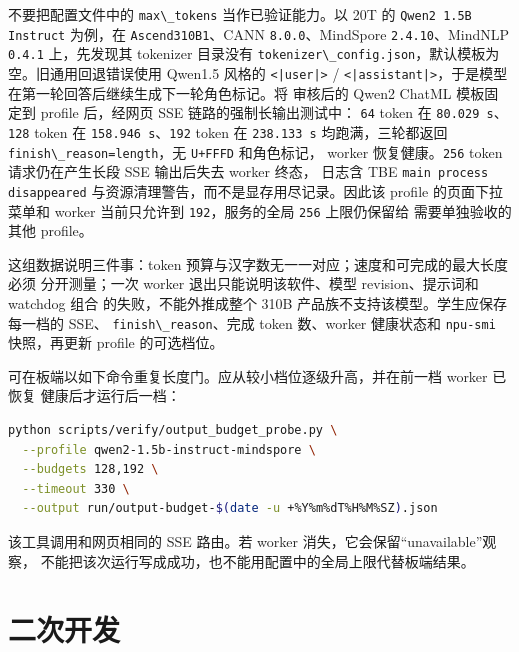 不要把配置文件中的 \passthrough{\lstinline!max\_tokens!}
当作已验证能力。以 20T 的 \passthrough{\lstinline!Qwen2 1.5B Instruct!}
为例，在 \passthrough{\lstinline!Ascend310B1!}、CANN
\passthrough{\lstinline!8.0.0!}、MindSpore
\passthrough{\lstinline!2.4.10!}、MindNLP
\passthrough{\lstinline!0.4.1!} 上，先发现其 tokenizer 目录没有
\passthrough{\lstinline!tokenizer\_config.json!}，默认模板为空。旧通用回退错误使用
Qwen1.5 风格的 \passthrough{\lstinline!<|user|>!} /
\passthrough{\lstinline!<|assistant|>!}，于是模型在第一轮回答后继续生成下一轮角色标记。将
审核后的 Qwen2 ChatML 模板固定到 profile 后，经网页 SSE
链路的强制长输出测试中： \passthrough{\lstinline!64!} token 在
\passthrough{\lstinline!80.029 s!}、\passthrough{\lstinline!128!} token
在 \passthrough{\lstinline!158.946 s!}、\passthrough{\lstinline!192!}
token 在 \passthrough{\lstinline!238.133 s!} 均跑满，三轮都返回
\passthrough{\lstinline!finish\_reason=length!}，无
\passthrough{\lstinline!U+FFFD!} 和角色标记， worker
恢复健康。\passthrough{\lstinline!256!} token 请求仍在产生长段 SSE
输出后失去 worker 终态， 日志含 TBE
\passthrough{\lstinline!main process disappeared!}
与资源清理警告，而不是显存用尽记录。因此该 profile 的页面下拉菜单和
worker 当前只允许到 \passthrough{\lstinline!192!}，服务的全局
\passthrough{\lstinline!256!} 上限仍保留给 需要单独验收的其他 profile。

这组数据说明三件事：token
预算与汉字数无一一对应；速度和可完成的最大长度必须 分开测量；一次 worker
退出只能说明该软件、模型 revision、提示词和 watchdog 组合
的失败，不能外推成整个 310B 产品族不支持该模型。学生应保存每一档的 SSE、
\passthrough{\lstinline!finish\_reason!}、完成 token 数、worker
健康状态和 \passthrough{\lstinline!npu-smi!} 快照，再更新 profile
的可选档位。

可在板端以如下命令重复长度门。应从较小档位逐级升高，并在前一档 worker
已恢复 健康后才运行后一档：

\begin{lstlisting}[language=bash]
python scripts/verify/output_budget_probe.py \
  --profile qwen2-1.5b-instruct-mindspore \
  --budgets 128,192 \
  --timeout 330 \
  --output run/output-budget-$(date -u +%Y%m%dT%H%M%SZ).json
\end{lstlisting}

该工具调用和网页相同的 SSE 路由。若 worker
消失，它会保留``unavailable''观察，
不能把该次运行写成成功，也不能用配置中的全局上限代替板端结果。

\section{二次开发}\label{ux4e8cux6b21ux5f00ux53d1}

